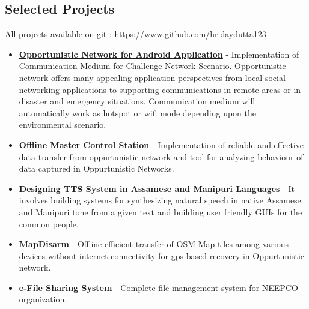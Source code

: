 \documentclass[margin, centered]{res}
\begin{document}
\begin{resume}
\section{Selected Projects}
All projects available on git : \url{https://www.github.com/hridaydutta123}
\begin{itemize}[leftmargin=*]
 \item \textbf{\href{https://github.com/Bug-Assassins/DFC_query_builder}{Opportunistic Network for Android Application}} - Implementation of Communication Medium for Challenge Network Scenario. Opportunistic network offers many appealing application perspectives from local social-networking applications to supporting communications in remote areas or in disaster and emergency situations. Communication medium will automatically work as hotspot or wifi mode depending upon the environmental scenario.
 \item \textbf{\href{http://www.github.com/hridaydutta123/offlinemcs}{Offline Master Control Station}} - Implementation of reliable and effective data transfer from oppurtunistic network and tool for analyzing behaviour of data captured in Oppurtunistic Networks.
 \item \textbf{\href{http://www.iitg.ernet.in/cseweb/tts/tts/Assamese/}{Designing TTS System in Assamese and Manipuri Languages}} - It involves building systems for synthesizing natural speech in native Assamese and Manipuri tone from a 	given text and building user friendly GUIs for the common people.
 \item \textbf{\href{https://github.com/hridaydutta123/MapDisarm}{MapDisarm}} - Offline efficient transfer of OSM Map tiles among various devices without internet connectivity for gps based recovery in Oppurtunistic network.
 \item \textbf{\href{https://github.com/hridaydutta123/MapDisarm}{e-File Sharing System}} - Complete file management system for NEEPCO organization.
\end{itemize}


\end{resume}
\end{document}
